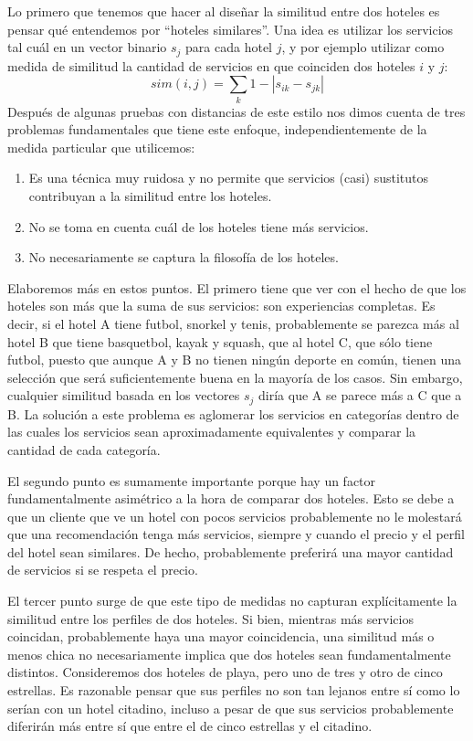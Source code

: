 \documentclass[12pt]{report}
\begin{document}
Lo primero que tenemos que hacer al diseñar la similitud entre dos hoteles es pensar qué entendemos por ``hoteles similares''. Una idea es utilizar los servicios tal cuál en un vector binario $s_j$ para cada hotel $j$, y por ejemplo utilizar como medida de similitud la cantidad de servicios en que coinciden dos hoteles $i$ y $j$:
\[
sim(i,j) = \sum_k 1 - |s_{ik} - s_{jk}|
\]
Después de algunas pruebas con distancias de este estilo nos dimos cuenta de tres problemas fundamentales que tiene este enfoque, independientemente de la medida particular que utilicemos:
\begin{enumerate}
	\item Es una técnica muy ruidosa y no permite que servicios (casi) sustitutos contribuyan a la similitud entre los hoteles.
	\item No se toma en cuenta cuál de los hoteles tiene más servicios.
	\item No necesariamente se captura la filosofía de los hoteles.
\end{enumerate}
Elaboremos más en estos puntos. El primero tiene que ver con el hecho de que los hoteles son más que la suma de sus servicios: son experiencias completas. Es decir, si el hotel A tiene futbol, snorkel y tenis, probablemente se parezca más al hotel B que tiene basquetbol, kayak y squash, que al hotel C, que sólo tiene futbol, puesto que aunque A y B no tienen ningún deporte en común, tienen una selección que será suficientemente buena en la mayoría de los casos. Sin embargo, cualquier similitud basada en los vectores $s_j$ diría que A se parece más a C que a B. La solución a este problema es aglomerar los servicios en categorías dentro de las cuales los servicios sean aproximadamente equivalentes y comparar la cantidad de cada categoría.

El segundo punto es sumamente importante porque hay un factor fundamentalmente asimétrico a la hora de comparar dos hoteles. Esto se debe a que un cliente que ve un hotel con pocos servicios probablemente no le molestará que una recomendación tenga más servicios, siempre y cuando el precio y el perfil del hotel sean similares. De hecho, probablemente preferirá una mayor cantidad de servicios si se respeta el precio.

El tercer punto surge de que este tipo de medidas no capturan explícitamente la similitud entre los perfiles de dos hoteles. Si bien, mientras más servicios coincidan, probablemente haya una mayor coincidencia, una similitud más o menos chica no necesariamente implica que dos hoteles sean fundamentalmente distintos. Consideremos dos hoteles de playa, pero uno de tres y otro de cinco estrellas. Es razonable pensar que sus perfiles no son tan lejanos entre sí como lo serían con un hotel citadino, incluso a pesar de que sus servicios probablemente diferirán más entre sí que entre el de cinco estrellas y el citadino.
\end{document}

